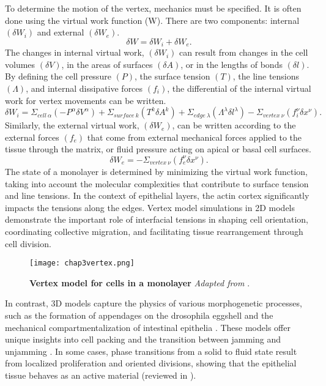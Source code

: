 To determine the motion of the vertex, mechanics must be specified. It is often done using the virtual work function (W). There are two components: internal $(\delta W_i)$ and external $(\delta W_e)$. 
$$ \delta W = \delta W_i + \delta W_e .$$ 
The changes in internal virtual work,  $(\delta W_i)$ can result from changes in the cell volumes $(\delta V)$, in the areas of surfaces $(\delta A)$, or in the lengths of bonds $(\delta l)$. By defining the cell pressure $(P)$, the surface tension $(T)$, the line tensions $(\Lambda)$, and internal dissipative forces $(f_i)$, the differential of the internal virtual work for vertex movements can be written. 
$$ \delta W_i = \Sigma_{cell\ \alpha} \left( -P^\alpha \delta V^\alpha \right) + \Sigma_{surface\ k} \left( T^k \delta A^k \right) + \Sigma_{edge\ \lambda} \left( \Lambda^\lambda \delta l^\lambda \right) - \Sigma_{vertex\ \nu} \left( f_i^\nu \delta x^\nu \right). $$
Similarly, the external virtual work, $(\delta W_e)$, can be written according to the external forces $(f_e)$ that come from external mechanical forces applied to the tissue through the matrix, or fluid pressure acting on apical or basal cell surfaces.
$$ \delta W_e =  - \Sigma_{vertex\ \nu} \left( f_e^\nu \delta x^\nu \right). $$
The state of a monolayer is determined by minimizing the virtual work function, taking into account the molecular complexities that contribute to surface tension and line tensions. In the context of epithelial layers, the actin cortex significantly impacts the tensions along the edges. Vertex model simulations in 2D models demonstrate the important role of interfacial tensions in shaping cell orientation, coordinating collective migration, and facilitating tissue rearrangement through cell division.

\begin{wrapfigure}{r}{5.5cm}
	\caption{\textbf{Vertex model for cells in a monolayer} \textit{Adapted from \cite{gomez-gonzalez2020}}.}\label{fig_3_7}
	\texttt{[image: chap3vertex.png]}
\end{wrapfigure} 

In contrast, 3D models capture the physics of various morphogenetic processes, such as the formation of appendages on the drosophila eggshell and the mechanical compartmentalization of intestinal epithelia \cite{osterfield2017, perez-gonzalez2021}. These models offer unique insights into cell packing and the transition between jamming and unjamming \cite{park2015, tang2022}. In some cases, phase transitions from a solid to fluid state result from localized proliferation and oriented divisions, showing that the epithelial tissue behaves as an active material (reviewed in \cite{lenne2022}).

